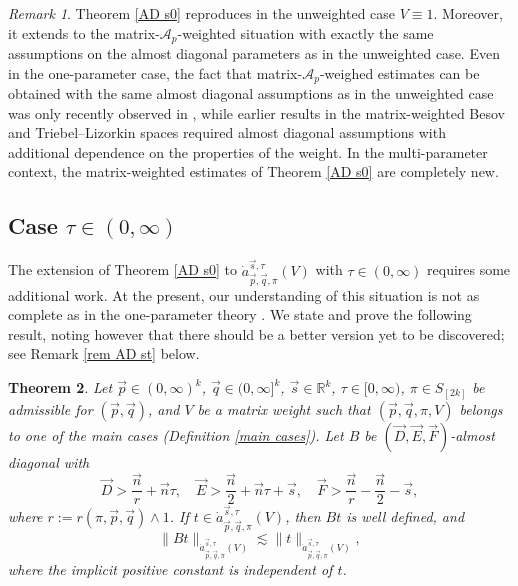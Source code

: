 \documentclass[11pt, reqno]{amsart}
\newtheorem{theorem}{Theorem}[section]
\theoremstyle{definition}
\theoremstyle{remark}
\newtheorem{remark}[theorem]{Remark}
\numberwithin{equation}{section}
\newcommand{\A}{\mathscr A}
\newcommand{\vD}{\vec D}
\newcommand{\vE}{\vec E}
\newcommand{\vF}{\vec F}
\newcommand{\R}{\mathbb R}
\newcommand{\vn}{\vec n}
\newcommand{\vp}{\vec p}
\newcommand{\vq}{\vec q}
\newcommand{\vs}{\vec s}
\newcommand{\atau}{\dot a^{\vs,\tau}_{\vp,\vq,\pi}}
\newcommand{\Norm}[2]{\|#1\|_{#2}}
\begin{document}
\begin{remark}
Theorem \ref{AD s0} reproduces \cite[Theorem 5.2]{GKP21} in the unweighted case $V\equiv 1$.
Moreover, it extends \cite[Theorem 5.2]{GKP21} to the matrix-$\A_p$-weighted situation
with exactly the same assumptions on the almost diagonal parameters as in the unweighted case.
Even in the one-parameter case, the fact that matrix-$\A_p$-weighed estimates
can be obtained with the same almost diagonal assumptions as in
the unweighted case was only recently observed in \cite{BHYY:1b},
while earlier results in the matrix-weighted Besov and Triebel--Lizorkin spaces \cite{FR04,FR21,Roud03}
required almost diagonal assumptions with additional dependence on the properties of the weight.
In the multi-parameter context, the matrix-weighted estimates of Theorem \ref{AD s0} are completely new.
\end{remark}

\subsection{Case $\tau\in(0,\infty)$} \label{tau approach}

The extension of Theorem \ref{AD s0} to $\atau(V)$ with $\tau\in(0,\infty)$ requires some additional work. At the present, our understanding of this situation is not as complete as in the one-parameter theory \cite{BHYY:1b}. We state and prove the following result, noting however that there should be a better version yet to be discovered; see Remark \ref{rem AD st} below.

\begin{theorem}\label{AD st}
Let $\vp\in(0,\infty)^k$, $\vq\in(0,\infty]^k$, $\vs\in\R^k$,
$\tau\in[0,\infty)$, $\pi\in S_{[2k]}$ be admissible for $(\vp,\vq)$, and $V$ be a matrix weight such that $(\vp,\vq,\pi,V)$ belongs to one of the main cases (Definition \ref{main cases}).
Let $B$ be $(\vD,\vE,\vF)$-almost diagonal with
\begin{equation}\label{DEF2}
\vD>\frac{\vn}{r}+\vn\tau,\quad
\vE>\frac{\vn}{2}+\vn\tau+\vs,\quad
\vF>\frac{\vn}{r}-\frac{\vn}{2}-\vs,
\end{equation}
where $r:=r(\pi,\vp,\vq)\wedge 1$.
If $t\in\atau(V)$, then $Bt$ is well defined, and
\begin{equation*}
\Norm{Bt}{\atau(V)}
\lesssim\Norm{t}{\atau(V)},
\end{equation*}
where the implicit positive constant is independent of $t$.
\end{theorem}
\end{document}
